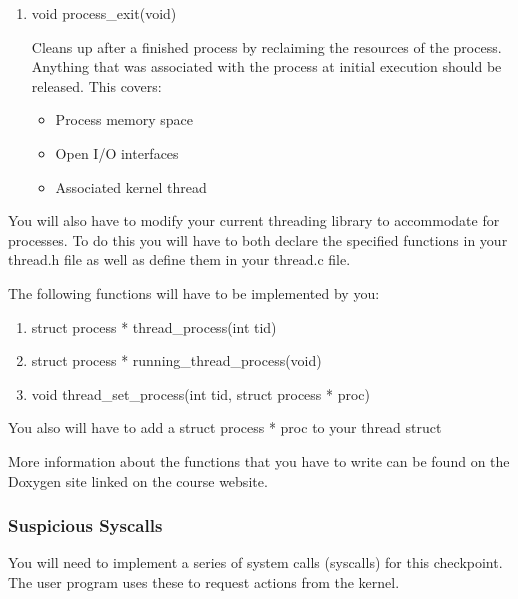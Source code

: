 \documentclass{article}
\begin{document}
\begin{enumerate}
		It's a useful exercise to try to figure out how such an approach could work with the
		CSRs and supervisor-mode instructions on your own. However, implementation on its
		own is a sufficient challenge and we don't require you to figure this out.
		You can read \textbf{Appendix C} to find out how you can carry out a context switch between user-mode
		to supervisor mode.
		
		\item{{\fix void process\_exit(void)}}
		
		Cleans up after a finished process by reclaiming the resources
		of the process. Anything that was associated with the process
		at initial execution should be released. This covers:
		
		\begin{itemize}
		    \item Process memory space
		    \item Open I/O interfaces
		    \item Associated kernel thread
		\end{itemize}
		
	\end{enumerate}
	You will also have to modify your current threading library to accommodate for processes. 
	To do this you will have to both declare the specified functions in your {\fix thread.h} file as well
	as define them in your {\fix thread.c} file.

	The following functions will have to be implemented by you:
	\begin{enumerate}
		\item {{\fix struct process * thread\_process(int tid) }}
		\item {{\fix struct process * running\_thread\_process(void) }}
		\item {{\fix void thread\_set\_process(int tid, struct process * proc)}}
	\end{enumerate}

	You also will have to add a {\fix struct process * proc} to your thread struct

	More information about the functions that you have to write can be found on the Doxygen site linked on the course website.
        \subsubsection{Suspicious Syscalls}
        You will need to implement a series of system calls (syscalls) for this checkpoint.
        The user program uses these to request actions from the kernel.
\end{document}
